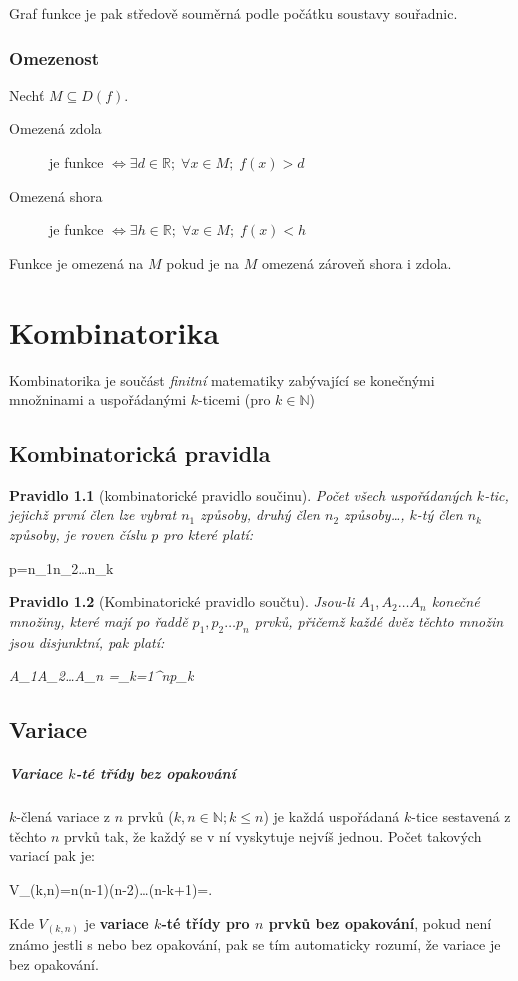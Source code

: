 \documentclass[12pt,a4wide,oneside,
headings]{report}
\newtheorem{prav}{Pravidlo}[chapter]\theoremstyle{definition}
\newenvironment{eq}{\begin{tcolorbox}[ams equation,colback=yourcolor!10!white,colframe=yourcolor]}{\end{tcolorbox}}
\begin{document}
Graf funkce je pak středově souměrná podle počátku soustavy souřadnic.

\subsection{Omezenost}

Nechť $M\subseteq D(f)$.

\begin{description}
\item[Omezená zdola] je funkce $\Leftrightarrow \exists d\in \mathbb{R};\; \forall x \in M;\; f(x)>d $
\item[Omezená shora] je funkce $\Leftrightarrow \exists h \in \mathbb{R};\; \forall x \in M;\; f(x)<h$
\end{description}

Funkce je omezená na $M$ pokud je na $M$ omezená zároveň shora i zdola.

\chapter{Kombinatorika}
Kombinatorika je součást \textit{finitní} matematiky zabývající se konečnými množninami a uspořádanými $k$-ticemi (pro $k\in\mathbb{N}$)
\section{Kombinatorická pravidla}
\begin{prav}[kombinatorické pravidlo součinu]
Počet všech uspořádaných $k$-tic, jejichž první člen lze vybrat $n_1$ způsoby, druhý člen $n_2$ způsoby\dots, $k$-tý člen $n_k$ způsoby, je roven číslu $p$ pro které platí:
\end{prav}
\begin{eq}
p=n_1\cdot n_2\cdot \ldots \cdot n_k
\end{eq}


\begin{prav}[Kombinatorické pravidlo součtu]
Jsou-li $A_1,A_2\ldots A_n$ konečné množiny, které mají po řaddě $p_1,p_2\ldots p_n$ prvků, přičemž každé dvěz těchto množin jsou disjunktní, pak platí:
\begin{eq}
A_1\cup A_2\cup\ldots\cup A_n =\sum_{k=1}^{n}p_k
\end{eq}
\end{prav}
\section{Variace}
\paragraph{Variace $k$-té třídy bez opakování} $k$-člená variace z $n$ prvků ($k,n \in \mathbb{N};k\leqslant n$) je každá uspořádaná $k$-tice sestavená z těchto $n$ prvků tak, že každý se v ní vyskytuje nejvíš jednou. Počet takových variací pak je:
\begin{eq}
V_{\left(k,n\right)}=n\cdot(n-1)\cdot(n-2)\cdot\ldots\cdot(n-k+1)=.
\end{eq}
Kde $V_{(k,n)}$ je \textbf{variace $k$-té třídy pro $n$ prvků bez opakování}, pokud není známo jestli s nebo bez opakování, pak se tím automaticky rozumí, že variace je bez opakování.
\end{document}
